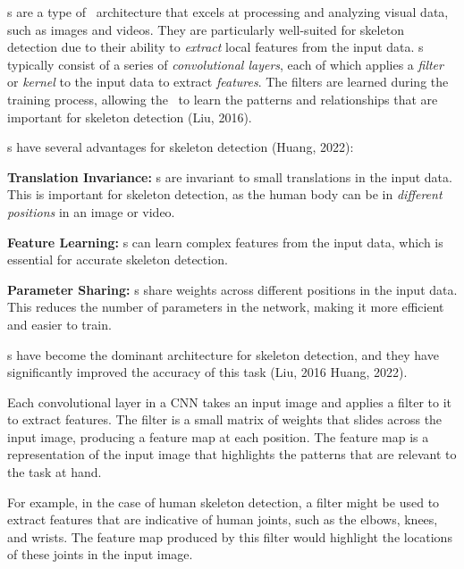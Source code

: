 \CNN\-s are a type of \NN\ architecture that excels at processing and analyzing visual data, such as images and videos. They are particularly well-suited for skeleton detection due to their ability to {\em extract} local features from the input data. \CNN\-s typically consist of a series of {\em convolutional layers}, each of which applies a {\em filter} or {\em kernel} to the input data to extract {\em features}. The filters are learned during the training process, allowing the \CNN\ to learn the patterns and relationships that are important for skeleton detection (\scc Liu, 2016).

\CNN\-s have several advantages for skeleton detection (\scc Huang, 2022):

\startitemize[1]
    \item {\bf Translation Invariance:} \CNN\-s are invariant to small translations in the input data. This is important for skeleton detection, as the human body can be in {\em different positions} in an image or video.
    \item {\bf Feature Learning:} \CNN\-s can learn complex features from the input data, which is essential for accurate skeleton detection.
    \item {\bf Parameter Sharing:} \CNN\-s share weights across different positions in the input data. This reduces the number of parameters in the network, making it more efficient and easier to train.
\stopitemize

\CNN\-s have become the dominant architecture for skeleton detection, and they have significantly improved the accuracy of this task (\scc Liu, 2016\; \scc Huang, 2022).


Each convolutional layer in a CNN takes an input image and applies a filter to it to extract features. The filter is a small matrix of weights that slides across the input image, producing a feature map at each position. The feature map is a representation of the input image that highlights the patterns that are relevant to the task at hand.

For example, in the case of human skeleton detection, a filter might be used to extract features that are indicative of human joints, such as the elbows, knees, and wrists. The feature map produced by this filter would highlight the locations of these joints in the input image.


